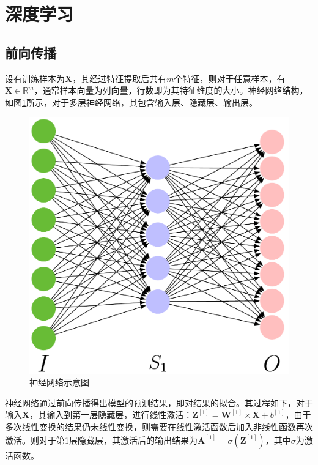 \section{深度学习}\label{sec:nn-dl}

\subsection{前向传播}

设有训练样本为$\mathbf{X}$，其经过特征提取后共有$m$个特征，则对于任意样本，有$\mathbf{X} \in \mathbb{R}^{m}$，通常样本向量为列向量，行数即为其特征维度的大小。神经网络结构，如图\ref{fig:nn}所示，对于多层神经网络，其包含输入层、隐藏层、输出层。
\begin{figure}[hbp]
  \centering
  \includegraphics[width=.7\textwidth]{figures/nn.pdf}
  \caption{神经网络示意图}
  \label{fig:nn}
\end{figure}

神经网络通过前向传播得出模型的预测结果，即对结果的拟合。其过程如下，对于输入$\mathbf{X}$，其输入到第一层隐藏层，进行线性激活：$\mathbf{Z}^{[1]} = \mathbf{W}^{[1]} \times \mathbf{X} + b^{[1]}$，由于多次线性变换的结果仍未线性变换，则需要在线性激活函数后加入非线性函数再次激活。则对于第1层隐藏层，其激活后的输出结果为$\mathbf{A}^{[1]}=\sigma (\mathbf{Z}^{[1]})$，其中$\sigma$为激活函数。

